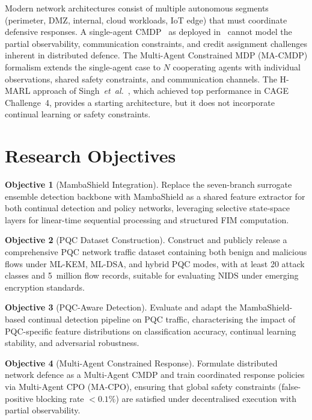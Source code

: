 \documentclass[12pt,a4paper]{article}
\theoremstyle{definition}
\newtheorem{objective}{Objective}[section]
\begin{document}
Modern network architectures consist of multiple autonomous segments (perimeter, DMZ, internal, cloud workloads, IoT edge) that must coordinate defensive responses. A single-agent CMDP~\cite{altman1999constrained} as deployed in~\cite{anaedevha2026cl_rl} cannot model the partial observability, communication constraints, and credit assignment challenges inherent in distributed defence. The Multi-Agent Constrained MDP (MA-CMDP) formalism extends the single-agent case to $N$ cooperating agents with individual observations, shared safety constraints, and communication channels. The H-MARL approach of Singh~\textit{et~al.}~\cite{singh2025hmarl}, which achieved top performance in CAGE Challenge~4, provides a starting architecture, but it does not incorporate continual learning or safety constraints.

\section{Research Objectives}
\label{sec:objectives}

\begin{objective}[MambaShield Integration]
\label{obj:mamba}
Replace the seven-branch surrogate ensemble detection backbone with MambaShield as a shared feature extractor for both continual detection and policy networks, leveraging selective state-space layers for linear-time sequential processing and structured FIM computation.
\end{objective}

\begin{objective}[PQC Dataset Construction]
\label{obj:pqc_data}
Construct and publicly release a comprehensive PQC network traffic dataset containing both benign and malicious flows under ML-KEM, ML-DSA, and hybrid PQC modes, with at least 20 attack classes and 5~million flow records, suitable for evaluating NIDS under emerging encryption standards.
\end{objective}

\begin{objective}[PQC-Aware Detection]
\label{obj:pqc_detect}
Evaluate and adapt the MambaShield-based continual detection pipeline on PQC traffic, characterising the impact of PQC-specific feature distributions on classification accuracy, continual learning stability, and adversarial robustness.
\end{objective}

\begin{objective}[Multi-Agent Constrained Response]
\label{obj:marl}
Formulate distributed network defence as a Multi-Agent CMDP and train coordinated response policies via Multi-Agent CPO (MA-CPO), ensuring that global safety constraints (false-positive blocking rate $< 0.1\%$) are satisfied under decentralised execution with partial observability.
\end{objective}
\end{document}
